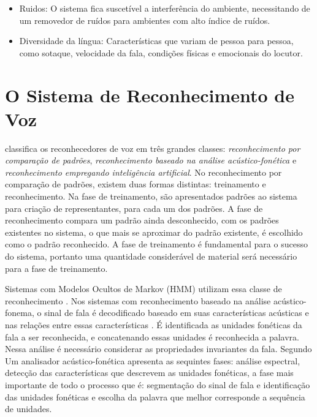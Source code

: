 \begin{itemize}
\item Ruidos: O sistema fica suscetível a interferência do ambiente, necessitando de um removedor de ruídos para ambientes com alto índice de ruídos.
\item Diversidade da língua: Características que variam de pessoa para pessoa, como sotaque, velocidade da fala, condições físicas e emocionais do locutor. 
\end{itemize}

\section{O Sistema de Reconhecimento de Voz}\label{sec:red_khn}

 classifica os reconhecedores de voz em três grandes classes: \textit{reconhecimento por comparação de padrões}, \textit{reconhecimento baseado na análise acústico-fonética} e \textit{reconhecimento empregando inteligência artificial}. No reconhecimento por comparação de padrões, existem duas formas distintas: treinamento e reconhecimento. Na fase de treinamento, são apresentados padrões ao sistema para criação de representantes, para cada um dos padrões. A fase de reconhecimento compara um padrão ainda desconhecido, com os padrões existentes no sistema, o que mais se aproximar do padrão existente, é escolhido como o padrão reconhecido. A fase de treinamento é fundamental para o sucesso do sistema, portanto uma quantidade considerável de material será necessário para a fase de treinamento. 

Sistemas com Modelos Ocultos de Markov (HMM) utilizam essa classe de reconhecimento \cite{AvaliaTecJose}. Nos sistemas com reconhecimento baseado na análise acústico-fonema, o sinal de fala é decodificado baseado em suas características acústicas e nas relações entre essas características \cite{DigSpeechNejat}. É identificada as unidades fonéticas da fala a ser reconhecida, e concatenando essas unidades é reconhecida a palavra. Nessa análise é necessário considerar as propriedades invariantes da fala. Segundo  Um analisador acústico-fonética apresenta as sequintes fases: análise espectral, detecção das características que descrevem as unidades fonéticas, a fase mais importante de todo o processo que é: segmentação do sinal de fala e identificação das unidades fonéticas e escolha da palavra que melhor corresponde a sequência de unidades. 

